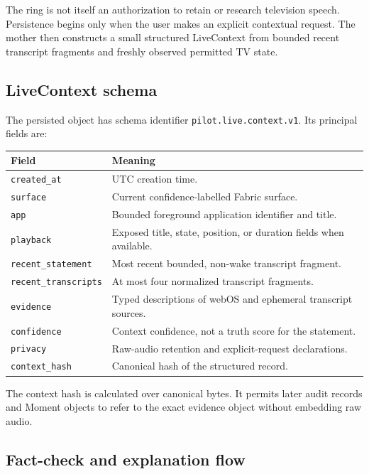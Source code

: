 \documentclass[11pt,a4paper]{article}
\begin{document}
The ring is not itself an authorization to retain or research television
speech.  Persistence begins only when the user makes an explicit contextual
request.  The mother then constructs a small structured LiveContext from
bounded recent transcript fragments and freshly observed permitted TV state.

\subsection{LiveContext schema}

The persisted object has schema identifier
\texttt{pilot.live.context.v1}.  Its principal fields are:

\begin{table}[htbp]
\centering
\small
\begin{tabularx}{\textwidth}{@{}L{37mm}Y@{}}
\toprule
Field & Meaning\\
\midrule
\texttt{created\_at} & UTC creation time.\\
\texttt{surface} & Current confidence-labelled Fabric surface.\\
\texttt{app} & Bounded foreground application identifier and title.\\
\texttt{playback} & Exposed title, state, position, or duration fields when
available.\\
\texttt{recent\_statement} & Most recent bounded, non-wake transcript fragment.\\
\texttt{recent\_transcripts} & At most four normalized transcript fragments.\\
\texttt{evidence} & Typed descriptions of webOS and ephemeral transcript
sources.\\
\texttt{confidence} & Context confidence, not a truth score for the statement.\\
\texttt{privacy} & Raw-audio retention and explicit-request declarations.\\
\texttt{context\_hash} & Canonical hash of the structured record.\\
\bottomrule
\end{tabularx}
\end{table}

The context hash is calculated over canonical bytes.  It permits later audit
records and Moment objects to refer to the exact evidence object without
embedding raw audio.

\subsection{Fact-check and explanation flow}
\end{document}
